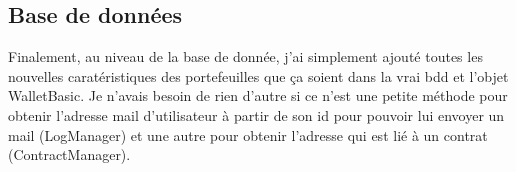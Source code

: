 \subsection{Base de données}

\begin{flushleft}
Finalement, au niveau de la base de donnée, j'ai simplement ajouté toutes les nouvelles caratéristiques des portefeuilles que ça soient dans la vrai bdd et l'objet WalletBasic.
  Je n'avais besoin de rien d'autre si ce n'est une petite méthode pour obtenir l'adresse mail d'utilisateur à partir de son id pour pouvoir lui envoyer un mail (LogManager) et une autre pour obtenir l'adresse qui est lié à un contrat (ContractManager).
\end{flushleft}

